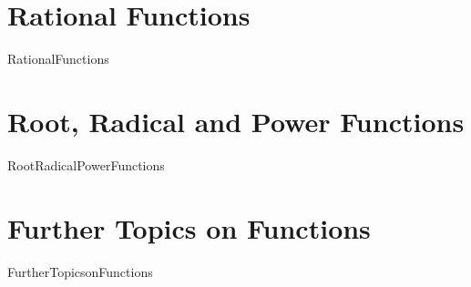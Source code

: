 
\chapter{Rational Functions}
\label{RationalFunctions}
\thispagestyle{empty}
{RationalFunctions}

\chapter{Root, Radical and Power Functions}
\label{RootRadicalPowerFunctions}
\thispagestyle{empty}
{RootRadicalPowerFunctions}

\chapter{Further Topics on Functions}
\label{FurtherTopicsonFunctions}
\thispagestyle{empty}
{FurtherTopicsonFunctions}





